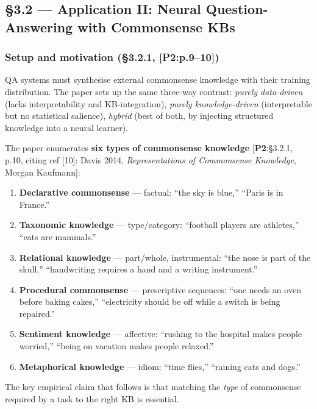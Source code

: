 \documentclass[11pt, a4paper]{article}
\newcommand{\paperref}[1]{\textcolor{srcBd}{\small[\textbf{P2}:#1]}}
\begin{document}
\subsection{§3.2 — Application II: Neural Question-Answering with Commonsense KBs}

\subsubsection*{Setup and motivation (§3.2.1, \paperref{p.9--10})}
QA systems must synthesise external commonsense knowledge with their training distribution. The paper sets up the same three-way contrast: \emph{purely data-driven} (lacks interpretability and KB-integration), \emph{purely knowledge-driven} (interpretable but no statistical salience), \emph{hybrid} (best of both, by injecting structured knowledge into a neural learner).

The paper enumerates \textbf{six types of commonsense knowledge} \paperref{§3.2.1, p.10, citing ref [10]: Davis 2014, \emph{Representations of Commonsense Knowledge}, Morgan Kaufmann}:

\begin{enumerate}[itemsep=0.1em]
  \item \textbf{Declarative commonsense} — factual: ``the sky is blue,'' ``Paris is in France.''
  \item \textbf{Taxonomic knowledge} — type/category: ``football players are athletes,'' ``cats are mammals.''
  \item \textbf{Relational knowledge} — part/whole, instrumental: ``the nose is part of the skull,'' ``handwriting requires a hand and a writing instrument.''
  \item \textbf{Procedural commonsense} — prescriptive sequences: ``one needs an oven before baking cakes,'' ``electricity should be off while a switch is being repaired.''
  \item \textbf{Sentiment knowledge} — affective: ``rushing to the hospital makes people worried,'' ``being on vacation makes people relaxed.''
  \item \textbf{Metaphorical knowledge} — idiom: ``time flies,'' ``raining cats and dogs.''
\end{enumerate}

The key empirical claim that follows is that matching the \emph{type} of commonsense required by a task to the right KB is essential.
\end{document}
